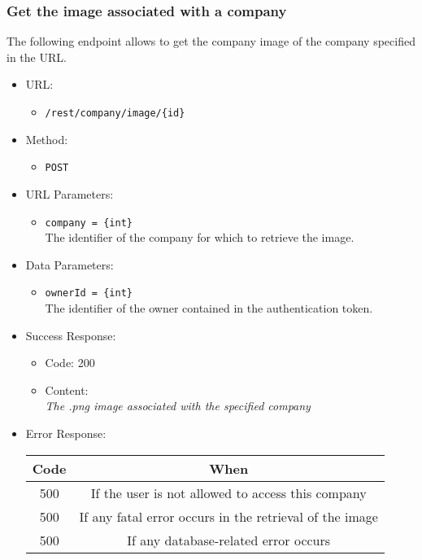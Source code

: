 \newpage
\subsubsection*{Get the image associated with a company}

The following endpoint allows to get the company image of the company specified in the URL.

\begin{itemize}
    
    \item URL: 
    \begin{itemize}
        \item \texttt{/rest/company/image/\{id\}}
    \end{itemize}
    
    \item Method: 
    \begin{itemize}
        \item \texttt{POST}
    \end{itemize}
    
    \item URL Parameters: 
    \begin{itemize}
        \item \texttt{company = \{int\}} \\
        The identifier of the company for which to retrieve the image.
    \end{itemize}
    \item Data Parameters: 
    \begin{itemize}
        \item \texttt{ownerId = \{int\}} \\
        The identifier of the owner contained in the authentication token.
    \end{itemize}
    
    \item Success Response: 
    \begin{itemize}
        \item Code: 200
        \item Content: \\
        \qquad \textit{The .png image associated with the specified company}    
    \end{itemize}
    
    \item Error Response:
    \begin{table}[!h]
    \centering 
    \begin{tabular}{|c|c|}
    \hline
    \multicolumn{1}{|c|}{\textbf{Code}} & \multicolumn{1}{c|}{\textbf{When}} \\ \hline
    500 & If the user is not allowed to access this company \\\hline 
    500 & If any fatal error occurs in the retrieval of the image \\\hline
    500 & If any database-related error occurs \\\hline
    \end{tabular} 
    \end{table} 
    
\end{itemize}



